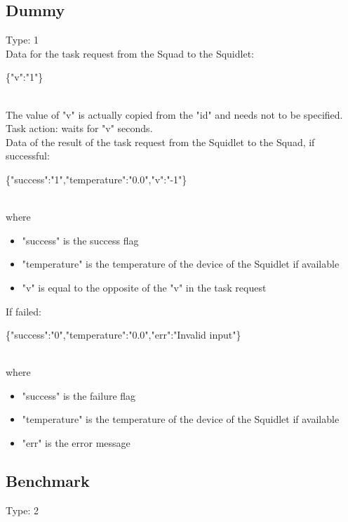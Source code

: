 \subsection{Dummy}

Type: 1\\

Data for the task request from the Squad to the Squidlet:\\
\begin{ttfamily}\{"v":"1"\}\end{ttfamily}\\
The value of "v" is actually copied from the "id" and needs not to be specified.\\

Task action: waits for "v" seconds.\\

Data of the result of the task request from the Squidlet to the Squad, if successful:\\
\begin{ttfamily}\{"success":"1","temperature":"0.0","v":"-1"\}\end{ttfamily}\\
where
\begin{itemize}
\item "success" is the success flag
\item "temperature" is the temperature of the device of the Squidlet if available
\item "v" is equal to the opposite of the "v" in the task request
\end{itemize}
If failed:\\
\begin{ttfamily}\{"success":"0","temperature":"0.0","err":"Invalid input"\}\end{ttfamily}\\
where
\begin{itemize}
\item "success" is the failure flag
\item "temperature" is the temperature of the device of the Squidlet if available
\item "err" is the error message
\end{itemize}

\subsection{Benchmark}

Type: 2\\

